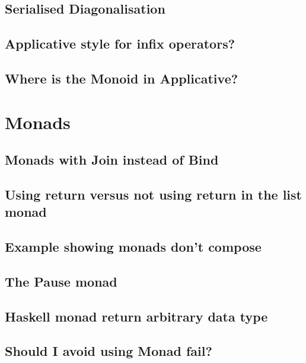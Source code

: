 \documentclass{book}%
\begin{document}
\section{Serialised Diagonalisation}


\section{Applicative style for infix operators?}


\section{Where is the Monoid in Applicative?}



\chapter{Monads}

\section{Monads with Join instead of Bind}


\section{Using return versus not using return in the list monad}


\section{Example showing monads don't compose}


\section{The Pause monad}


\section{Haskell monad return arbitrary data type}


\section{Should I avoid using Monad fail?}

\end{document}
